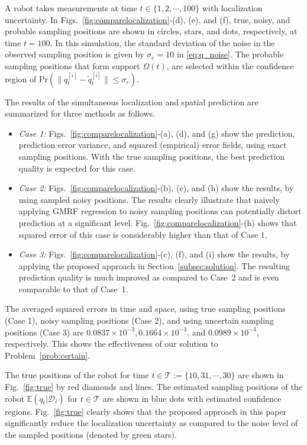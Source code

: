 \documentclass[letterpaper, 10 pt, conference]{ieeeconf}
\newcommand{\set}[1]{\{#1\}} \newcommand{\norm}[1]{\|#1\|}
\newcommand{\mc}[1]{\mathcal{#1}} \newcommand{\mb}[1]{\mathbf{#1}}
\newcommand{\E}{\mathbb{E}}
\newcommand{\D}[2]{\mc{D}_{#2}}
\begin{document}
A robot takes measurements at time $t \in \set{1,2, \cdots, 100}$ with localization uncertainty. In Figs.~\ref{fig:comparelocalization}-(d), (e), and (f), true, noisy, and probable sampling positions are shown in circles, stars, and dots, respectively, at time $t=100$. In this simulation, the standard deviation of the noise in the observed sampling position is given by $\sigma_e = 10$ in \eqref{eq:q_noise}. The probable sampling positions that form support $\Omega(t)$, are selected within the confidence region of { Pr$(\| q_t^{[i]}-\tilde q_t^{[i]} \| \leq \sigma_e )$}.


The results of the simultaneous localization and spatial prediction are summarized for three methods as follows.
\begin{itemize}
\item {\em Case 1:} Figs.~\ref{fig:comparelocalization}-(a), (d), and (g) show the prediction, prediction error variance, and squared (empirical) error fields, using exact sampling positions. With the true sampling positions, the best prediction quality is expected for this case. 
\item {\em Case 2:} Figs.~\ref{fig:comparelocalization}-(b), (e), and (h) show the  results, by using sampled noisy positions. The results clearly illustrate that naively applying GMRF regression to noisy sampling positions can potentially distort prediction at a significant level. Fig.~\ref{fig:comparelocalization}-(h) shows that squared error of this case is considerably higher than that of Case 1.
\item {\em Case 3:} 
Figs.~\ref{fig:comparelocalization}-(c), (f), and (i) show the  results, by applying the proposed approach in Section~\ref{subsec:solution}.  The resulting prediction quality is much improved as compared to Case~2 and is even comparable to that of  Case~1.
\end{itemize}
 

The averaged squared errors in time and space, using true sampling positions (Case 1), noisy sampling positions (Case 2), and using uncertain sampling positions (Case 3) are 
 $0.0837 \times 10^{-3}, 0.1664 \times 10^{-3}$, and $0.0989 \times 10^{-3}$, respectively. This shows the effectiveness of our solution to Problem~\ref{prob:certain}.


The true positions of the robot for time $t \in \mathcal{T}:=\set{10,31, \cdots, 30}$ are shown in Fig.~\ref{fig:true} by red diamonds and lines. The estimated sampling positions of the robot $\E (q_t|\D{}{t} )$ for $t \in \mathcal{T}$ are shown in blue dots with estimated confidence regions. Fig.~\ref{fig:true} clearly shows that the proposed approach in this paper significantly reduce the localization uncertainty as compared to the noise level of the sampled positions (denoted by green stars). 
\end{document}
